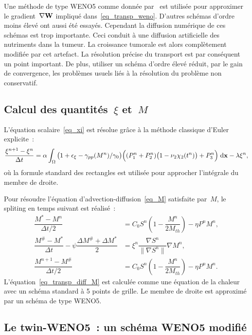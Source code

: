 \documentclass[11pt]{amsart}
\numberwithin{equation}{section}
\newcommand{\W}{{\bf W}}
\newcommand{\chiS}{\chi_2}
\newcommand{\nuS}{\nu_2}
\newcommand{\gammapp}{\gamma_{pp}}
\newcommand{\Ms}{M_{th}}
\newcommand{\vecx}{\mathbf{x}}
\newcommand{\twinweno}{twin-WENO5}
\begin{document}
Une méthode de type WENO5 comme donnée par~\cite{Liu1994} est utilisée pour approximer le gradient~$\nabla \W$ impliqué  dans~\eqref{eq_transp_weno}.
D'autres schémas d'ordre moins élevé ont aussi été essayés. Cependant la diffusion numérique de ces schémas est trop importante. Ceci conduit à une diffusion artificielle des nutriments dans la tumeur. La croissance tumorale est alors complètement modifiée par cet artefact. La résolution précise du transport est par conséquent un point important. De plus,  utiliser un schéma d'ordre élevé réduit, par le gain de convergence, les problèmes usuels liés à la résolution du problème non conservatif.

\subsection{Calcul des quantités~$\xi$ et~$M$}
L'équation scalaire~\eqref{eq_xi} est résolue grâce à la méthode classique d'Euler explicite~:
\begin{equation}\label{eq:xi_disc}
\dfrac{\xi^{n+1}-\xi^n}{\Delta t} = \alpha \int_\Omega \big(1+\epsilon_{\xi} - \gammapp(M^n) / \gamma_0 \big)\Big((P_1^n +P_2^n) \big(1-\nuS \chiS(t^n) \big)+P_3^n \Big) \textrm{\;d}\vecx - \lambda \xi^n,
\end{equation} 
où la formule standard des rectangles est utilisée pour approcher l'intégrale du membre de droite.


Pour résoudre l'équation d'advection-diffusion~\eqref{eq_M}
satisfaite par~$M$, le spliting en temps suivant est réalisé~:
\begin{align}
\dfrac{M^*-M^n}{\Delta t/2} &= C_0 S^n \left( 1-\dfrac{M^n}{2\Ms}\right) - \eta P^nM^n, %
\\
\dfrac{M^{\#}-M^*}{\Delta t} - \psi \dfrac{ \Delta M^\# + \Delta M^*}{2} &= \xi^n  \dfrac{\nabla S^n}{\| \nabla S^n \| }\nabla M^n, %
\label{eq_transp_diff_M}\\
\dfrac{M^{n+1}-M^\#}{\Delta t/2} &= C_0 S^n \left( 1-\dfrac{M^n}{2\Ms}\right) - \eta P^nM^n. \label{eq_snd_membre_M}
\end{align}
L'équation~\eqref{eq_transp_diff_M} est calculée comme une équation de la chaleur avec un schéma standard à 5 points de grille. Le membre de droite est approximé par un schéma de type WENO5.


\subsection{Le \twinweno~: un schéma WENO5 modifié}
\end{document}
